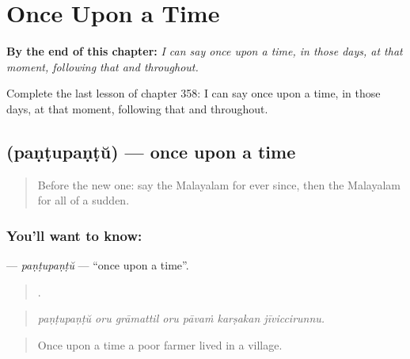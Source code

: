 
\chapter{Once Upon a Time}
\label{ch:ml-once-upon-a-time}

\begin{chapteropening}
\textbf{By the end of this chapter:} \emph{I can say once upon a time, in those days, at that moment, following that and throughout.}

Complete the last lesson of chapter 358: I can say once upon a time, in those days, at that moment, following that and throughout.
\end{chapteropening}

\section[\texorpdfstring{\ml{പണ്ടുപണ്ട്} (paṇṭupaṇṭŭ)}{പണ്ടുപണ്ട് (paṇṭupaṇṭŭ)}]{ (paṇṭupaṇṭŭ) — once upon a time}

\label{lesson:ML-C358-pantupantu}



\begin{quote}
Before the new one: say the Malayalam for ever since, then the Malayalam for all of a sudden.
\end{quote}

\subsection*{You'll want to know: }
\textbf{} — \emph{paṇṭupaṇṭŭ} — \textquotedblleft{}once upon a time\textquotedblright{}.

\begin{quote}
      .
\end{quote}

\begin{quote}
\emph{paṇṭupaṇṭŭ oru grāmattil oru pāvaṁ karṣakan jīviccirunnu.}
\end{quote}

\begin{quote}
Once upon a time a poor farmer lived in a village.
\end{quote}

